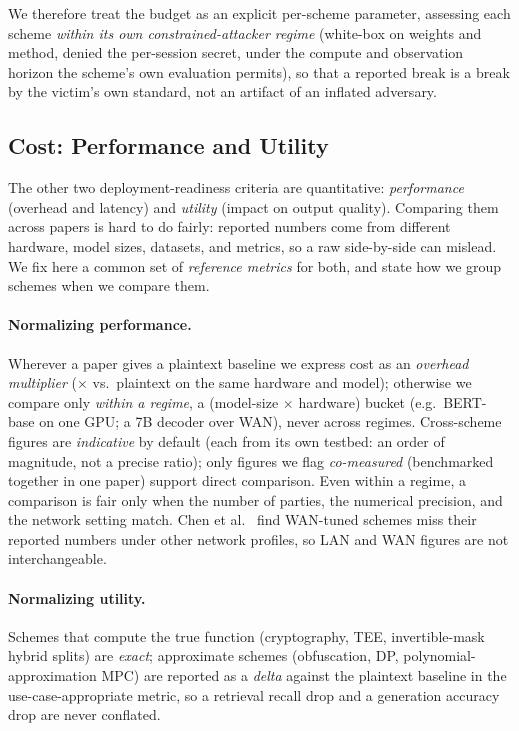 We therefore treat the budget as an explicit per-scheme parameter, assessing each scheme
\emph{within its own constrained-attacker regime} (white-box on weights and method, denied the
per-session secret, under the compute and observation horizon the scheme's own evaluation
permits), so that a reported break is a break by the victim's own standard, not an artifact of
an inflated adversary.

\subsection{Cost: Performance and Utility}
\label{sec:comparison}

The other two deployment-readiness criteria are quantitative: \emph{performance}
(overhead and latency) and \emph{utility} (impact on output quality). Comparing them
across papers is hard to do fairly: reported numbers come from different hardware, model
sizes, datasets, and metrics, so a raw side-by-side can mislead. We fix here a common set of
\emph{reference metrics} for both, and state how we group schemes when we compare them.

\paragraph{Normalizing performance.}
Wherever a paper gives a plaintext baseline we express cost as an \emph{overhead multiplier}
($\times$ vs.\ plaintext on the same hardware and model); otherwise we compare only \emph{within
a regime}, a (model-size $\times$ hardware) bucket (e.g.\ BERT-base on one GPU; a 7B decoder
over WAN), never across regimes. Cross-scheme figures are \emph{indicative} by default (each
from its own testbed: an order of magnitude, not a precise ratio); only figures we flag
\emph{co-measured} (benchmarked together in one paper) support direct comparison. Even within a
regime, a comparison is fair only when the number of parties, the numerical precision, and the
network setting match. Chen et al.~\citep{chen_sok_pti} find WAN-tuned schemes miss their
reported numbers under other network profiles, so LAN and WAN figures are not interchangeable.

\paragraph{Normalizing utility.}
Schemes that compute the true function (cryptography, TEE, invertible-mask hybrid splits) are
\emph{exact}; approximate schemes (obfuscation, DP, polynomial-approximation MPC) are reported
as a \emph{delta} against the plaintext baseline in the use-case-appropriate metric, so a
retrieval recall drop and a generation accuracy drop are never conflated.

